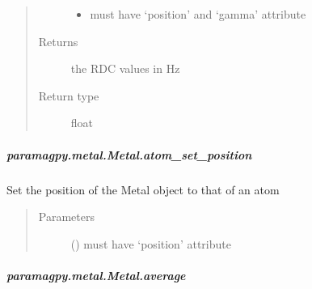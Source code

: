 \documentclass[a4paper,10pt,english,openany,oneside]{sphinxmanual}
\begin{document}
\begin{fulllineitems}
\begin{fulllineitems}
\begin{fulllineitems}
\begin{quote}
\begin{description}
\begin{itemize}
\item {} 
\sphinxAtStartPar
{} \textendash{} must have ‘position’ and ‘gamma’ attribute

\end{itemize}

\item[{Returns}] \leavevmode
\sphinxAtStartPar
{} \textendash{} the RDC values in Hz

\item[{Return type}] \leavevmode
\sphinxAtStartPar
float

\end{description}\end{quote}

\end{fulllineitems}



\subparagraph{paramagpy.metal.Metal.atom\_set\_position}
\label{\detokenize{reference/generated/paramagpy.metal.Metal.atom_set_position:paramagpy-metal-metal-atom-set-position}}\label{\detokenize{reference/generated/paramagpy.metal.Metal.atom_set_position::doc}}

\begin{fulllineitems}
\label{\detokenize{reference/generated/paramagpy.metal.Metal.atom_set_position:paramagpy.metal.Metal.atom_set_position}}
\sphinxAtStartPar
Set the position of the Metal object to that of an atom
\begin{quote}\begin{description}
\item[{Parameters}] \leavevmode
\sphinxAtStartPar
{} () \textendash{} must have ‘position’ attribute

\end{description}\end{quote}

\end{fulllineitems}



\subparagraph{paramagpy.metal.Metal.average}
\label{\detokenize{reference/generated/paramagpy.metal.Metal.average:paramagpy-metal-metal-average}}\label{\detokenize{reference/generated/paramagpy.metal.Metal.average::doc}}


\end{fulllineitems}
\end{fulllineitems}
\end{document}
